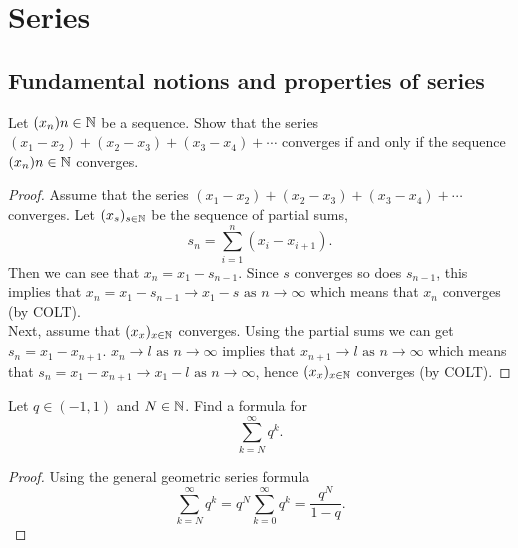 \documentclass[10pt, a4paper]{article}
\newcommand{\limas}[3][n]{#2 \rightarrow #3 \text{ as } #1 \rightarrow \infty}
\renewcommand{\infsum}[1][n = 1]{\sum_{#1}^{\infty}}
\newcommand{\seq}[2][x]{(#1_{#2})_{#2 \in \N}}
\begin{document}
\newpage

\section{Series}

\subsection{Fundamental notions and properties of series}

\begin{example}
    Let $(x_n){n \in \mathbb{N}}$ be a sequence. Show that the series
    $(x_1 - x_2) + (x_2 - x_3) + (x_3 - x_4) + \cdots$ converges if and only if the sequence $(x_n){n \in \mathbb{N}}$ converges.
    \begin{proof}
        Assume that the series $(x_1 - x_2) + (x_2 - x_3) + (x_3 - x_4) + \cdots$ converges. Let $\seq{s}$ be the sequence of partial sums,
        \[
        s_n = \sum_{i = 1}^{n}(x_i - x_{i + 1}).
        \]
        Then we can see that $x_n = x_1 - s_{n - 1}$. Since $s$ converges so does $s_{n - 1}$, this implies that $\limas{x_n = x_1 - s_{n - 1}}{x_1 - s}$ which means that $x_n$ converges (by COLT). \\

        Next, assume that $\seq{x}$ converges. Using the partial sums we can get $s_n = x_1 - x_{n + 1}$. $\limas{x_n}{l}$ implies that $\limas{x_{n + 1}}{l}$ which means that $\limas{s_n = x_1 - x_{n + 1}}{x_1 - l}$, hence $\seq{x}$ converges (by COLT).
    \end{proof}
\end{example}

\begin{example}
    Let $q \in (-1, 1)$ and $N \in \mathbb{N}$. Find a formula for
    \[
    \infsum[k = N]{q ^ k}.
    \]
    \begin{proof}
        Using the general geometric series formula
        \[
        \infsum[k = N] q ^ k = q ^ N \infsum[k = 0] q ^ k = \frac{q ^ N}{1 - q}.
        \]
    \end{proof}
\end{example}
\end{document}
